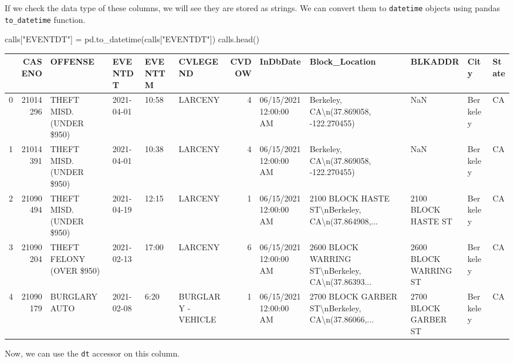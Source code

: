 \documentclass[
  letterpaper,
  DIV=11,
  numbers=noendperiod]{scrreprt}
\newenvironment{Shaded}{\begin{snugshade}}{\end{snugshade}}
\newcommand{\NormalTok}[1]{\textcolor[rgb]{0.00,0.23,0.31}{#1}}
\newcommand{\OperatorTok}[1]{\textcolor[rgb]{0.37,0.37,0.37}{#1}}
\newcommand{\StringTok}[1]{\textcolor[rgb]{0.13,0.47,0.30}{#1}}
\begin{document}
If we check the data type of these columns, we will see they are stored
as strings. We can convert them to \texttt{datetime} objects using
pandas \texttt{to\_datetime} function.

\begin{Shaded}
\begin{Highlighting}[]
\NormalTok{calls[}\StringTok{"EVENTDT"}\NormalTok{] }\OperatorTok{=}\NormalTok{ pd.to\_datetime(calls[}\StringTok{"EVENTDT"}\NormalTok{])}
\NormalTok{calls.head()}
\end{Highlighting}
\end{Shaded}

\begin{tabular}{lrllllrlllll}
\toprule
{} &    CASENO &                   OFFENSE &    EVENTDT & EVENTTM &            CVLEGEND &  CVDOW &                InDbDate &                                     Block\_Location &                BLKADDR &      City & State \\
\midrule
0 &  21014296 &  THEFT MISD. (UNDER \$950) & 2021-04-01 &   10:58 &             LARCENY &      4 &  06/15/2021 12:00:00 AM &             Berkeley, CA\textbackslash n(37.869058, -122.270455) &                    NaN &  Berkeley &    CA \\
1 &  21014391 &  THEFT MISD. (UNDER \$950) & 2021-04-01 &   10:38 &             LARCENY &      4 &  06/15/2021 12:00:00 AM &             Berkeley, CA\textbackslash n(37.869058, -122.270455) &                    NaN &  Berkeley &    CA \\
2 &  21090494 &  THEFT MISD. (UNDER \$950) & 2021-04-19 &   12:15 &             LARCENY &      1 &  06/15/2021 12:00:00 AM &  2100 BLOCK HASTE ST\textbackslash nBerkeley, CA\textbackslash n(37.864908,... &    2100 BLOCK HASTE ST &  Berkeley &    CA \\
3 &  21090204 &  THEFT FELONY (OVER \$950) & 2021-02-13 &   17:00 &             LARCENY &      6 &  06/15/2021 12:00:00 AM &  2600 BLOCK WARRING ST\textbackslash nBerkeley, CA\textbackslash n(37.86393... &  2600 BLOCK WARRING ST &  Berkeley &    CA \\
4 &  21090179 &             BURGLARY AUTO & 2021-02-08 &    6:20 &  BURGLARY - VEHICLE &      1 &  06/15/2021 12:00:00 AM &  2700 BLOCK GARBER ST\textbackslash nBerkeley, CA\textbackslash n(37.86066,... &   2700 BLOCK GARBER ST &  Berkeley &    CA \\
\bottomrule
\end{tabular}

Now, we can use the \texttt{dt} accessor on this column.
\end{document}
